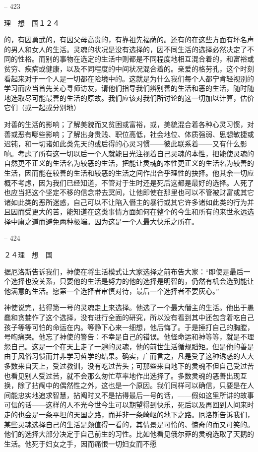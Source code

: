 \documentclass[11pt,oneside]{book}
\begin{document}
\begin{common-format}
    

-- 423

    理　想　国１２４

    的，有因勇武的，有因父母高贵的，有靠祖先福荫的。还有的在这些方面有坏名声的男人和女人的生活。灵魂的状况是没有选择的，因不同生活的选择必然决定了不同的性格。而别的事物在选定的生活中则都是不同程度地相互混合着的，和富裕或贫穷、疾病或健康，以及不同程度的中间状况混合着的。亲爱的格劳孔，这个时刻看起来对于一个人是一切都在险境中的。这就是为什么我们每个人都宁肯轻视别的学习而应当首先关心寻师访友，请他们指导我们辨别善的生活和恶的生活，随时随地选取尽可能最善的生活的原故。我们应该对我们所讨论的这一切加以计算，估价它们（或一起或分别地）

    对善的生活的影响；了解美貌而又贫困或富裕，或，美貌混合着各种心灵习惯，对善或恶有哪些影响；了解出身贵贱、职位高低，社会地位、体质强弱、思想敏捷或迟钝，和一切诸如此类先天的或后得的心灵习惯——彼此联系着——又有什么影响。考虑了所有这一切以后一个人就能目光注视着自己灵魂的本性，把能使灵魂的自然更不正义的生活名为较恶的生活，把能让灵魂的本性更正义的生活名为较善的生活，因而能在较善的生活和较恶的生活之间作出合乎理性的抉择。他其余一切应概不考虑，因为我们已经知道，不管对于生时还是死后这都是最好的选择。人死了也应当把这个坚定不移的信念带去冥间，让他即使在那里也可以不管被财富或其它诸如此类的恶所迷惑，自己可以不让陷入僭主的暴行或其它许多诸如此类的行为并且因而受更大的苦，能知道在这类事情方面如何在整个的今生和所有的来世永远选择中庸之道而避免两种极端。因为这是一个人最大快乐之所在。

    

-- 424

    ２４理　想　国

    据厄洛斯告诉我们，神使在将生活模式让大家选择之前布告大家：“即使是最后一个选择也没关系，只要他的生活是努力的他的选择是明智的，仍然有机会选到能让他满意的生活。愿第一个选择者审慎对待，最后一个选择者不要灰心。”

    神使说完，拈得第一号的灵魂走上来选择。他选了一个最大僭主的生活。他出于愚蠢和贪婪作了这个选择，没有进行全面的研究，所以没有看到其中还包含着吃自己孩子等等可怕的命运在内。等静下心来一细想，他后悔了。于是捶打自己的胸膛，号啕痛哭。他忘了神使的警告：不幸是自己的错误。他怪命运和神等等，就是不理怨自己。这是一个在天上走了一趟的灵魂，他的前世生活循规蹈矩。但是他的善是由于风俗习惯而并非学习哲学的结果。确实，广而言之，凡是受了这种诱惑的人大多数来自天上，受过教训，没有吃过苦头；可那些来自地下的灵魂不但自己受过苦也看见别人受过苦，就不会那么匆忙草率地作出选择了。多数灵魂的恶善出现互换，除了拈阄中的偶然性之外，这也是一个原因。我们同样可以确信，只要是在人间能忠实地追求智慧，拈阄时又不是拈得最后一号的话，——假如这里所讲的故事可信的话——这样的人不光今世今生可以期望得到快乐，死后以及再回到人间来时走的也会是一条平坦的天国之路，而并非一条崎岖的地下之路。厄洛斯告诉我们，某些灵魂选择自己的生活是颇值得一看的，其情景是可怜的、惊奇的而又可笑的。他们的选择大部分决定于自己前生的习性。比如他看见俄尔菲的灵魂选取了天鹅的生活。他死于妇女之手，因而痛恨一切妇女而不愿


\end{common-format}
\end{document}
